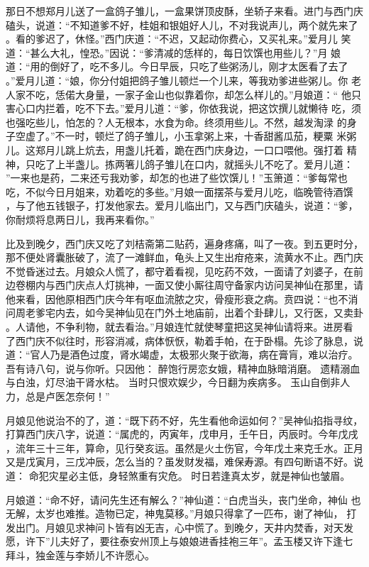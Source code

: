 那日不想郑月儿送了一盒鸽子雏儿，一盒果饼顶皮酥，坐轿子来看。进门与西门庆
磕头，说道：“不知道爹不好，桂姐和银姐好人儿，不对我说声儿，两个就先来了
。看的爹迟了，休怪。”西门庆道：“不迟，又起动你费心，又买礼来。”爱月儿
笑道：“甚么大礼，惶恐。”因说：“爹清减的恁样的，每日饮馔也用些儿？”月
娘道：“用的倒好了，吃不多儿。今日早辰，只吃了些粥汤儿，刚才太医看了去了
。”爱月儿道：“娘，你分付姐把鸽子雏儿顿烂一个儿来，等我劝爹进些粥儿。你
老人家不吃，恁偌大身量，一家子金山也似靠着你，却怎么样儿的。”月娘道：“
他只害心口内拦着，吃不下去。”爱月儿道：“爹，你依我说，把这饮撰儿就懒待
吃，须也强吃些儿，怕怎的？人无根本，水食为命。终须用些儿。不然，越发淘渌
的身子空虚了。”不一时，顿烂了鸽子雏儿，小玉拿粥上来，十香甜酱瓜茄，粳粟
米粥儿。这郑月儿跳上炕去，用盏儿托着，跪在西门庆身边，一口口喂他。强打着
精神，只吃了上半盏儿。拣两箸儿鸽子雏儿在口内，就摇头儿不吃了。爱月儿道：
”一来也是药，二来还亏我劝爹，却怎的也进了些饮馔儿！”玉箫道：“爹每常也
吃，不似今日月姐来，劝着吃的多些。”月娘一面摆茶与爱月儿吃，临晚管待酒馔
，与了他五钱银子，打发他家去。爱月儿临出门，又与西门庆磕头，说道：“爹，
你耐烦将息两日儿，我再来看你。”

比及到晚夕，西门庆又吃了刘桔斋第二贴药，遍身疼痛，叫了一夜。到五更时分，
那不便处肾囊胀破了，流了一滩鲜血，龟头上又生出疳疮来，流黄水不止。西门庆
不觉昏迷过去。月娘众人慌了，都守着看视，见吃药不效，一面请了刘婆子，在前
边卷棚内与西门庆点人灯挑神，一面又使小厮往周守备家内访问吴神仙在那里，请
他来看，因他原相西门庆今年有呕血流脓之灾，骨瘦形衰之病。贲四说：“也不消
问周老爹宅内去，如今吴神仙见在门外土地庙前，出着个卦肆儿，又行医，又卖卦
。人请他，不争利物，就去看治。”月娘连忙就使琴童把这吴神仙请将来。进房看
了西门庆不似往时，形容消减，病体恹恹，勒着手帕，在于卧榻。先诊了脉息，说
道：“官人乃是酒色过度，肾水竭虚，太极邪火聚于欲海，病在膏肓，难以治疗。
吾有诗八句，说与你听。只因他：
醉饱行房恋女娥，精神血脉暗消磨。
遗精溺血与白浊，灯尽油干肾水枯。
当时只恨欢娱少，今日翻为疾病多。
玉山自倒非人力，总是卢医怎奈何！”

月娘见他说治不的了，道：“既下药不好，先生看他命运如何？”吴神仙掐指寻纹，
打算西门庆八字，说道：“属虎的，丙寅年，戊申月，壬午日，丙辰时。今年戊戌
，流年三十三年，算命，见行癸亥运。虽然是火土伤官，今年戊土来克壬水。正月
又是戊寅月，三戊冲辰，怎么当的？虽发财发福，难保寿源。有四句断语不好。说
道：
命犯灾星必主低，身轻煞重有灾危。
时日若逢真太岁，就是神仙也皱眉。

月娘道：“命不好，请问先生还有解么？”神仙道：“白虎当头，丧门坐命，神仙
也无解，太岁也难推。造物已定，神鬼莫移。”月娘只得拿了一匹布，谢了神仙，
打发出门。月娘见求神问卜皆有凶无吉，心中慌了。到晚夕，天井内焚香，对天发
愿，许下”儿夫好了，要往泰安州顶上与娘娘进香挂袍三年”。孟玉楼又许下逢七
拜斗，独金莲与李娇儿不许愿心。

